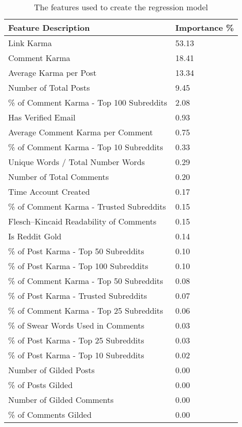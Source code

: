 \begin{table}[tb]
    \caption{The features used to create the regression model}
    \label{tab:tablename}
    \centering
    \scriptsize

    \begin{tabular}{l|l}
    \hline

    \hline
    \textbf{Feature Description} & \textbf{Importance \%} \\
    \hline
Link Karma & 53.13\\
Comment Karma & 18.41\\
Average Karma per Post & 13.34\\
Number of Total Posts & 9.45\\
\% of Comment Karma - Top 100 Subreddits & 2.08\\
Has Verified Email & 0.93\\
Average Comment Karma per Comment & 0.75\\
\% of Comment Karma - Top 10 Subreddits & 0.33\\
Unique Words / Total Number Words & 0.29\\
Number of Total Comments & 0.20\\
Time Account Created & 0.17\\
\% of Comment Karma - Trusted Subreddits & 0.15\\
Flesch--Kincaid Readability of Comments & 0.15\\
Is Reddit Gold & 0.14\\
\% of Post Karma - Top 50 Subreddits & 0.10\\
\% of Post Karma - Top 100 Subreddits & 0.10\\
\% of Comment Karma - Top 50 Subreddits & 0.08\\
\% of Post Karma - Trusted Subreddits & 0.07\\
\% of Comment Karma - Top 25 Subreddits & 0.06\\
\% of Swear Words Used in Comments & 0.03\\
\% of Post Karma - Top 25 Subreddits & 0.03\\
\% of Post Karma - Top 10 Subreddits & 0.02\\
Number of Gilded Posts & 0.00\\
\% of Posts Gilded & 0.00\\
Number of Gilded Comments & 0.00\\
\% of Comments Gilded & 0.00\\


    \hline

    \hline
    \end{tabular}
\end{table}
